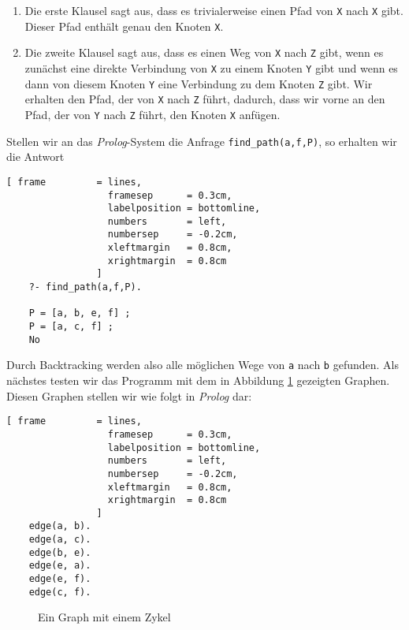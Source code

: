 \begin{enumerate}
\item Die erste Klausel sagt aus, dass es trivialerweise einen Pfad von \texttt{X} nach
      \texttt{X} gibt.  Dieser Pfad enthält genau den Knoten \texttt{X}.
\item Die zweite Klausel sagt aus, dass es einen Weg von \texttt{X} nach \texttt{Z}
      gibt, wenn es zunächst eine direkte Verbindung von \texttt{X} zu einem Knoten
      \texttt{Y} gibt und wenn es dann von diesem Knoten \texttt{Y} eine Verbindung
      zu dem Knoten \texttt{Z} gibt.  Wir erhalten den Pfad, der von \texttt{X} nach
      \texttt{Z} führt, dadurch, dass wir vorne an den Pfad, der von \texttt{Y} nach \texttt{Z}
      führt, den Knoten \texttt{X} anfügen.
\end{enumerate}
Stellen wir an das \textsl{Prolog}-System die Anfrage \texttt{find\_path(a,f,P)}, so
erhalten wir die Antwort
\begin{Verbatim}[ frame         = lines, 
                  framesep      = 0.3cm, 
                  labelposition = bottomline,
                  numbers       = left,
                  numbersep     = -0.2cm,
                  xleftmargin   = 0.8cm,
                  xrightmargin  = 0.8cm
                ]
    ?- find_path(a,f,P).
 
    P = [a, b, e, f] ;   
    P = [a, c, f] ;
    No
\end{Verbatim}
Durch Backtracking werden also alle möglichen Wege von \texttt{a} nach \texttt{b} gefunden.
Als nächstes testen wir das Programm mit dem in Abbildung \ref{fig:graph2} gezeigten
Graphen.  Diesen Graphen stellen wir wie folgt in \textsl{Prolog} dar:
\begin{Verbatim}[ frame         = lines, 
                  framesep      = 0.3cm, 
                  labelposition = bottomline,
                  numbers       = left,
                  numbersep     = -0.2cm,
                  xleftmargin   = 0.8cm,
                  xrightmargin  = 0.8cm
                ]
    edge(a, b).
    edge(a, c).
    edge(b, e).
    edge(e, a).
    edge(e, f).
    edge(c, f).
\end{Verbatim}

\begin{figure}[!h]
  \centering
  \caption{Ein Graph mit einem Zykel}
  \label{fig:graph2}
\end{figure}

